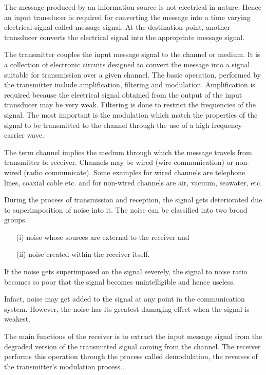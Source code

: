 The message produced by an information source is not electrical in
nature. Hence an input transducer is required for converting the
message into a time varying electrical signal called message
signal. At the destination point, another transducer converts the
electrical signal into the appropriate message signal.

\eject

 The transmitter couples the input message
signal to the channel or medium. It is a collection of electronic
circuits designed to convert the message into a signal suitable for
transmission over a given channel. The basic operation, performed by
the transmitter include amplification, filtering and
modulation. Amplification is required because the electrical signal
obtained from the output of the input transducer may be very
weak. Filtering is done to restrict the frequencies of the signal. The
most important is the modulation which match the properties of the
signal to be transmitted to the channel through the use of a high
frequency carrier wave.

 The term channel implies the
medium through which the message travels from transmitter to
receiver. Channels may be wired (wire communication) or non-wired
(radio communicate). Some examples for wired channels are telephone
lines, coaxial cable etc. and for non-wired channels are air, vacuum,
seawater, etc.

During the process of transmission and reception, the signal gets
deteriorated due to superimposition of noise into it. The noise can be
classified into two broad groups.
\begin{itemize}
\item[(i)] noise whose sources are external to the receiver and 

\item[(ii)] noise created within the receiver itself.
\end{itemize}

If the noise gets superimposed on the signal severely, the signal to
noise ratio becomes so poor that the signal becomes unintelligible and
hence useless. 

Infact, noise may get added to the signal at any point in the
communication system. However, the noise has its greatest damaging
effect when the signal is weakest.

 The main functions of the receiver is to
extract the input message signal from the degraded version of the
transmitted signal coming from the channel. The receiver performs this
operation through the process called demodulation, the reverses  of
the transmitter's modulation process...

